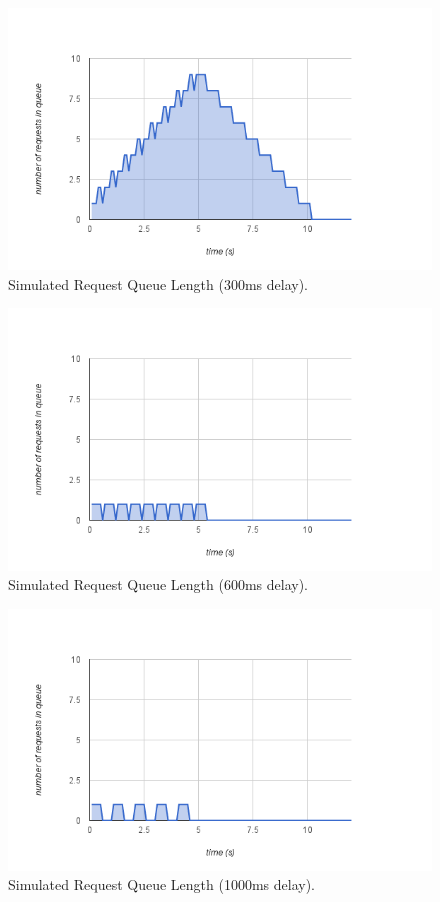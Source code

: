 \documentclass[se,resubmit]{uw-wkrpt}
\begin{document}
\begin{figure}
  \centering
  \includegraphics[width=6.25in]{sim-300ms}
  \caption{Simulated Request Queue Length (300ms delay).}
  \label{fig:sim-300ms}
\end{figure}

\begin{figure}
  \centering
  \includegraphics[width=6.25in]{sim-600ms}
  \caption{Simulated Request Queue Length (600ms delay).}
  \label{fig:sim-600ms}
\end{figure}

\begin{figure}
  \centering
  \includegraphics[width=6.25in]{sim-1000ms}
  \caption{Simulated Request Queue Length (1000ms delay).}
  \label{fig:sim-1000ms}
\end{figure}
\end{document}
